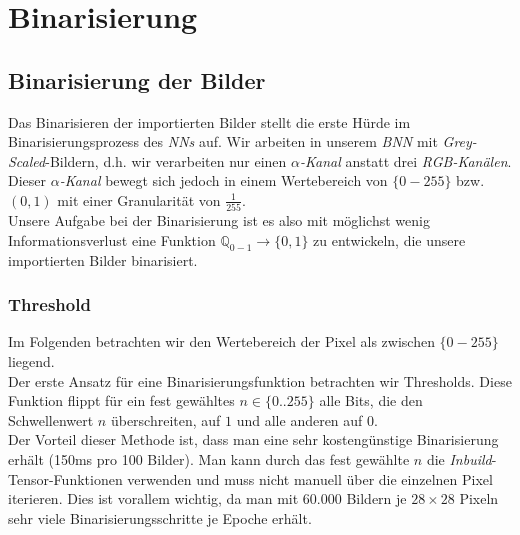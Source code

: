 \chapter{Binarisierung}
\section{Binarisierung der Bilder}
Das Binarisieren der importierten Bilder stellt die erste Hürde im Binarisierungsprozess des \textit{NNs} auf. Wir arbeiten in unserem \textit{BNN} mit \textit{Grey-Scaled}-Bildern, d.h. wir verarbeiten nur einen $\alpha$\textit{-Kanal} anstatt drei \textit{RGB-Kanälen}. Dieser $\alpha$\textit{-Kanal} bewegt sich jedoch in einem Wertebereich von $\{0-255\}$ bzw. $(0,1)$ mit einer Granularität von $\frac{1}{255}$.\\

Unsere Aufgabe bei der Binarisierung ist es also mit möglichst wenig Informationsverlust eine Funktion $\mathbb{Q}_{0-1} \rightarrow \{0,1\}$ zu entwickeln, die unsere importierten Bilder binarisiert.

\subsection{Threshold}

Im Folgenden betrachten wir den Wertebereich der Pixel als zwischen $\{0-255\}$ liegend.\\Der erste Ansatz für eine Binarisierungsfunktion betrachten wir Thresholds. Diese Funktion flippt für ein fest gewähltes $n \in \{0..255\}$ alle Bits, die den Schwellenwert $n$ überschreiten, auf $1$ und alle anderen auf $0$.\\

Der Vorteil dieser Methode ist, dass man eine sehr kostengünstige Binarisierung erhält (150ms pro 100 Bilder). Man kann durch das fest gewählte $n$ die \textit{Inbuild}-Tensor-Funktionen verwenden und muss nicht manuell über die einzelnen Pixel iterieren. Dies ist vorallem wichtig, da man mit $60.000$ Bildern je $28 \times 28$ Pixeln sehr viele Binarisierungsschritte je Epoche erhält.\\

